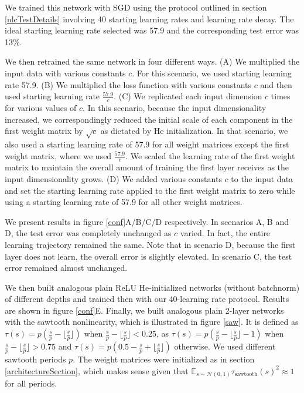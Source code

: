 \documentclass{article} %
\begin{document}
We trained this network with SGD using the protocol outlined in section \ref{nlcTestDetails} involving 40 starting learning rates and learning rate decay. The ideal starting learning rate selected was 57.9 and the corresponding test error was 13\%. 

We then retrained the same network in four different ways. (A) We multiplied the input data with various constants $c$. For this scenario, we used starting learning rate 57.9. (B) We multiplied the loss function with various constants $c$ and then used starting learning rate $\frac{57.9}{c}$. (C) We replicated each input dimension $c$ times for various values of $c$. In this scenario, because the input dimensionality increased, we correspondingly reduced the initial scale of each component in the first weight matrix by $\sqrt{c}$ as dictated by He initialization. In that scenario, we also used a starting learning rate of 57.9 for all weight matrices except the first weight matrix, where we used $\frac{57.9}{c}$. We scaled the learning rate of the first weight matrix to maintain the overall amount of training the first layer receives as the input dimensionality grows. (D) We added various constants $c$ to the input data and set the starting learning rate applied to the first weight matrix to zero while using a starting learning rate of 57.9 for all other weight matrices.

We present results in figure \ref{conf}A/B/C/D respectively. In scenarios A, B and D, the test error was completely unchanged as $c$ varied. In fact, the entire learning trajectory remained the same. Note that in scenario D, because the first layer does not learn, the overall error is slightly elevated. In scenario C, the test error remained almost unchanged.

We then built analogous plain ReLU He-initialized networks (without batchnorm) of different depths and trained then with our 40-learning rate protocol. Results are shown in figure \ref{conf}E. Finally, we built analogous plain 2-layer networks with the sawtooth nonlinearity, which is illustrated in figure \ref{saw}. It is defined as $\tau(s) = p(\frac{s}{p} - \lfloor\frac{s}{p}\rfloor)$ when $\frac{s}{p} - \lfloor\frac{s}{p}\rfloor < 0.25$, as $\tau(s) = p(\frac{s}{p} - \lfloor\frac{s}{p}\rfloor - 1)$ when $\frac{s}{p} - \lfloor\frac{s}{p}\rfloor > 0.75$ and $\tau(s) = p(0.5 - \frac{s}{p} + \lfloor\frac{s}{p}\rfloor)$ otherwise. We used different sawtooth periods $p$. The weight matrices were initialized as in section \ref{architectureSection}, which makes sense given that $\mathbb{E}_{s \sim \mathcal{N}(0,1)}\tau_\text{sawtooth}(s)^2 \approx 1$ for all periods.
\end{document}
